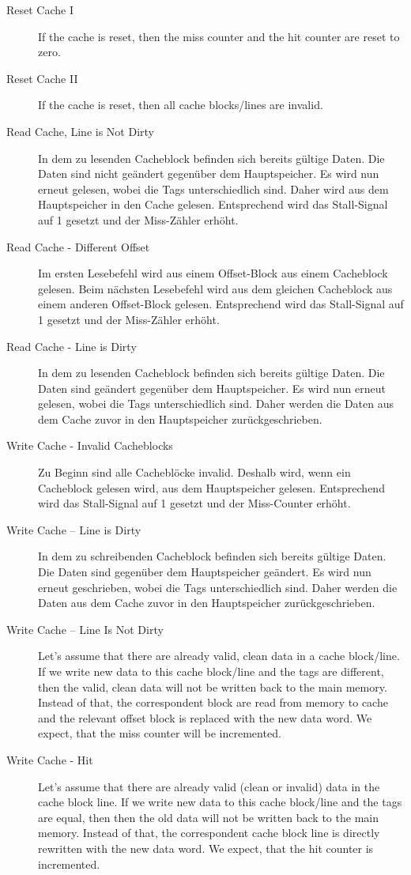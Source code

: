 \begin{description}
	\item[Reset Cache I] If the cache is reset, then the miss counter and the hit counter are reset to zero.
	\item[Reset Cache II] If the cache is reset, then all cache blocks/lines are invalid.
	
	\item[Read Cache, Line is Not Dirty] In dem zu lesenden Cacheblock befinden sich bereits gültige Daten. Die Daten sind nicht geändert gegenüber dem Hauptspeicher. Es wird nun erneut gelesen, wobei die Tags unterschiedlich sind. Daher wird aus dem Hauptspeicher in den Cache gelesen. Entsprechend wird das Stall-Signal auf 1 gesetzt und der Miss-Zähler erhöht.
\item[Read Cache - Different Offset] Im ersten Lesebefehl wird aus einem Offset-Block aus einem Cacheblock gelesen. Beim nächsten Lesebefehl wird aus dem gleichen Cacheblock aus einem anderen Offset-Block gelesen. Entsprechend wird das Stall-Signal auf 1 gesetzt und der Miss-Zähler erhöht.
\item[Read Cache - Line is Dirty] In dem zu lesenden Cacheblock befinden sich bereits gültige Daten. Die Daten sind geändert gegenüber dem Hauptspeicher. Es wird nun erneut gelesen, wobei die Tags unterschiedlich sind. Daher werden die Daten aus dem Cache zuvor in den Hauptspeicher zurückgeschrieben.
\item[Write Cache - Invalid Cacheblocks] Zu Beginn sind alle Cacheblöcke invalid. Deshalb wird, wenn ein Cacheblock gelesen wird, aus dem Hauptspeicher gelesen. Entsprechend wird das Stall-Signal auf 1 gesetzt und der Miss-Counter erhöht.
\item[Write Cache – Line is Dirty] In dem zu schreibenden Cacheblock befinden sich bereits gültige Daten. Die Daten sind gegenüber dem Hauptspeicher geändert. Es wird nun erneut geschrieben, wobei die Tags unterschiedlich sind. Daher werden die Daten aus dem Cache zuvor in den Hauptspeicher zurückgeschrieben.
\item[Write Cache – Line Is Not Dirty] Let's assume that there are already valid, clean data in a cache block/line. If we write new data to this cache block/line and the tags are different, then the valid, clean data will not be written back to the main memory. Instead of that, the correspondent block are read from memory to cache and the relevant offset block is replaced with the new data word. We expect, that the miss counter will be incremented.
\item[Write Cache - Hit] Let's assume that there are already valid (clean or invalid) data in the cache block line. If we write new data to this cache block/line and the tags are equal, then then the old data will not be written back to the main memory. Instead of that, the correspondent cache block line is directly rewritten with the new data word. We expect, that the hit counter is incremented.

\end{description}
